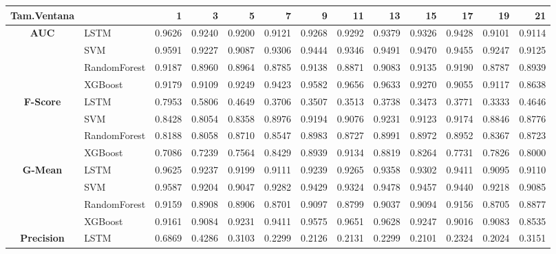 \begin{table}[h]
	\centering
	\begin{adjustbox}{max width=15cm}
		\begin{tabular}{|c|l|r|r|r|r|r|r|r|r|r|r|r|}
			\hline
			\textbf{Tam.Ventana}&         &      1  &      3  &      5  &      7  &      9  &      11 &      13 &      15 &      17 &      19 &      21 \\
			\hline
			\textbf{AUC} & LSTM &  0.9626 &  0.9240 &  0.9200 &  0.9121 &  0.9268 &  0.9292 &  0.9379 &  0.9326 &  0.9428 &  0.9101 &  0.9114 \\
			& SVM &  0.9591 &  0.9227 &  0.9087 &  0.9306 &  0.9444 &  0.9346 &  0.9491 &  0.9470 &  0.9455 &  0.9247 &  0.9125 \\
			& RandomForest &  0.9187 &  0.8960 &  0.8964 &  0.8785 &  0.9138 &  0.8871 &  0.9083 &  0.9135 &  0.9190 &  0.8787 &  0.8939 \\
			& XGBoost &  0.9179 &  0.9109 &  0.9249 &  0.9423 &  0.9582 &  0.9656 &  0.9633 &  0.9270 &  0.9055 &  0.9117 &  0.8638 \\
			\hline
			\textbf{F-Score} & LSTM &  0.7953 &  0.5806 &  0.4649 &  0.3706 &  0.3507 &  0.3513 &  0.3738 &  0.3473 &  0.3771 &  0.3333 &  0.4646 \\
			& SVM &  0.8428 &  0.8054 &  0.8358 &  0.8976 &  0.9194 &  0.9076 &  0.9231 &  0.9123 &  0.9174 &  0.8846 &  0.8776 \\
			& RandomForest &  0.8188 &  0.8058 &  0.8710 &  0.8547 &  0.8983 &  0.8727 &  0.8991 &  0.8972 &  0.8952 &  0.8367 &  0.8723 \\
			& XGBoost &  0.7086 &  0.7239 &  0.7564 &  0.8429 &  0.8939 &  0.9134 &  0.8819 &  0.8264 &  0.7731 &  0.7826 &  0.8000 \\
			\hline
			\textbf{G-Mean} & LSTM &  0.9625 &  0.9237 &  0.9199 &  0.9111 &  0.9239 &  0.9265 &  0.9358 &  0.9302 &  0.9411 &  0.9095 &  0.9110 \\
			& SVM &  0.9587 &  0.9204 &  0.9047 &  0.9282 &  0.9429 &  0.9324 &  0.9478 &  0.9457 &  0.9440 &  0.9218 &  0.9085 \\
			& RandomForest &  0.9159 &  0.8908 &  0.8906 &  0.8701 &  0.9097 &  0.8799 &  0.9037 &  0.9094 &  0.9156 &  0.8705 &  0.8877 \\
			& XGBoost &  0.9161 &  0.9084 &  0.9231 &  0.9411 &  0.9575 &  0.9651 &  0.9628 &  0.9247 &  0.9016 &  0.9083 &  0.8535 \\
			\hline
			\textbf{Precision} & LSTM &  0.6869 &  0.4286 &  0.3103 &  0.2299 &  0.2126 &  0.2131 &  0.2299 &  0.2101 &  0.2324 &  0.2024 &  0.3151 \\

\end{tabular}
\end{adjustbox}
\end{table}
